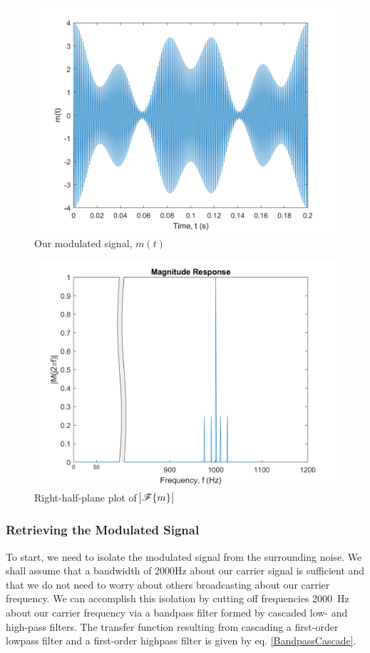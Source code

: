 \documentclass[journal]{IEEEtran}
\begin{document}
\begin{figure}[ht]
	\centering
  \includegraphics[width=\columnwidth]{MagTime.png}
    \caption{Our modulated signal, $m(t)$}
    \label{ModTime}
\end{figure}
    
\begin{figure}[h!]
	\centering
  \includegraphics[width=\columnwidth]{MagResponse.png}
    \caption{Right-half-plane plot of $\abs{\mathscr{F}\{m\}}$}
    \label{ModMagResponse}
\end{figure}

\subsubsection{Retrieving the Modulated Signal}
To start, we need to isolate the modulated signal from the surrounding noise. We shall assume that a bandwidth of 2000Hz about our carrier signal is sufficient and that we do not need to worry about others broadcasting about our carrier frequency. We can accomplish this isolation by cutting off frequencies \SI{2000}{\hertz} about our carrier frequency via a bandpass filter formed by cascaded low- and high-pass filters. The transfer function resulting from cascading a first-order lowpass filter and a first-order highpass filter is given by eq. \eqref{BandpassCascade}.
\end{document}
